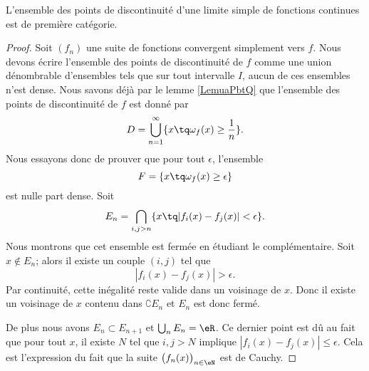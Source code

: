 \begin{theorem}
    L'ensemble des points de discontinuité d'une limite simple de fonctions continues est de première catégorie.
\end{theorem}

\begin{proof}
    Soit \( (f_n)\) une suite de fonctions convergent simplement vers \( f\). Nous devons écrire l'ensemble des points de discontinuité de \( f\) comme une union dénombrable d'ensembles tels que sur tout intervalle \( I\), aucun de ces ensembles n'est dense. Nous savons déjà par le lemme \ref{LemuaPbtQ} que l'ensemble des points de discontinuité  de \( f\) est donné par
    \begin{equation}
        D=\bigcup_{n=1}^{\infty}\{ x\tq \omega_f(x)\geq \frac{1}{  n } \}.
    \end{equation}
    Nous essayons donc de prouver que pour tout \( \epsilon\), l'ensemble 
    \begin{equation}
        F=\{ x\tq \omega_f(x)\geq \epsilon \}
    \end{equation}
    est nulle part dense. Soit
    \begin{equation}
        E_n=\bigcap_{i,j>n}\{ x\tq | f_i(x)-f_j(x) |<\epsilon \}.
    \end{equation}
    Nous montrons que cet ensemble est fermée en étudiant le complémentaire. Soit \( x\notin E_n\); alors il existe un couple \( (i,j)\) tel que
    \begin{equation}
        | f_i(x)-f_j(x) |>\epsilon.
    \end{equation}
    Par continuité, cette inégalité reste valide dans un voisinage de \( x\). Donc il existe un voisinage de \( x\) contenu dans \( \complement E_n\) et \( E_n\) est donc fermé.

    De plus nous avons \( E_n\subset E_{n+1}\) et \( \bigcup_nE_n=\eR\). Ce dernier point est dû au fait que pour tout \( x\), il existe \( N\) tel que \( i,j>N\) implique \( | f_i(x)-f_j(x) |\leq \epsilon\). Cela est l'expression du fait que la suite \( \big( f_n(x) \big)_{n\in \eN}\) est de Cauchy.


\end{proof}

